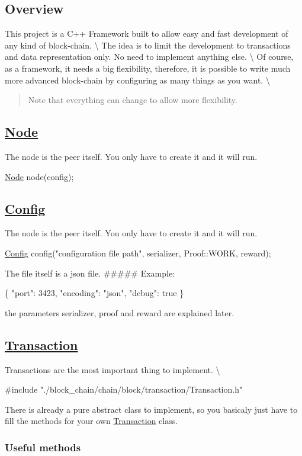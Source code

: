 \subsection*{Overview}

This project is a C++ Framework built to allow easy and fast development of any kind of block-\/chain. \textbackslash{} The idea is to limit the development to transactions and data representation only. No need to implement anything else. \textbackslash{} Of course, as a framework, it needs a big flexibility, therefore, it is possible to write much more advanced block-\/chain by configuring as many things as you want. \textbackslash{} \begin{quote}
Note that everything can change to allow more flexibility. \end{quote}
\subsection*{\mbox{\hyperlink{classNode}{Node}}}

The node is the peer itself. You only have to create it and it will run. 
\begin{DoxyCode}
\mbox{\hyperlink{classNode}{Node}} node(config);
\end{DoxyCode}
 \subsection*{\mbox{\hyperlink{classConfig}{Config}}}

The node is the peer itself. You only have to create it and it will run. 
\begin{DoxyCode}
\mbox{\hyperlink{classConfig}{Config}} config(\textcolor{stringliteral}{"configuration file path"}, serializer, Proof::WORK, reward);
\end{DoxyCode}
 The file itself is a json file. \#\#\#\#\# Example\+: 
\begin{DoxyCode}
\{
  "port": 3423,
  "encoding": "json",
  "debug": true
\}
\end{DoxyCode}
 the parameters serializer, proof and reward are explained later. \subsection*{\mbox{\hyperlink{classTransaction}{Transaction}}}

Transactions are the most important thing to implement. \textbackslash{} 
\begin{DoxyCode}
\textcolor{preprocessor}{\#include "./block\_chain/chain/block/transaction/Transaction.h"}
\end{DoxyCode}
 There is already a pure abstract class to implement, so you basicaly just have to fill the methods for your own \mbox{\hyperlink{classTransaction}{Transaction}} class. \subsubsection*{Useful methods}

